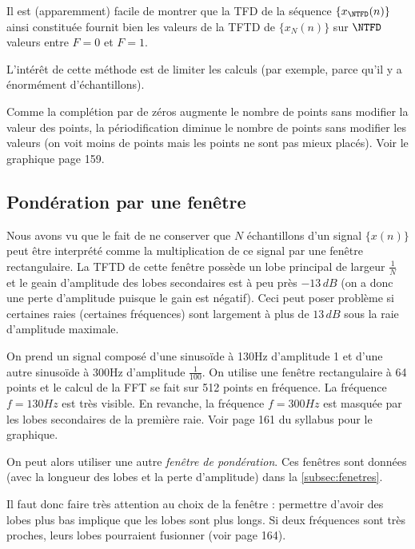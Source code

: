                 Il est (apparemment) facile de montrer que la TFD de la séquence $\{x_{\NTFD}(n)\}$ ainsi constituée fournit bien les valeurs de la TFTD de $\{x_N(n)\}$ sur $\NTFD$ valeurs entre $F=0$ et $F=1$.

                L'intérêt de cette méthode est de limiter les calculs (par exemple, parce qu'il y a énormément d'échantillons).

                Comme la complétion par de zéros augmente le nombre de points sans modifier la valeur des points, la périodification diminue le nombre de points sans modifier les valeurs (on voit moins de points mais les points ne sont pas mieux placés). Voir le graphique page 159.
        
        \subsection{Pondération par une fenêtre}
            Nous avons vu que le fait de ne conserver que $N$ échantillons d'un signal $\{x(n)\}$ peut être interprété comme la multiplication de ce signal par une fenêtre rectangulaire. La TFTD de cette fenêtre possède un lobe principal de largeur $\frac{1}{N}$ et le geain d'amplitude des lobes secondaires est à peu près $-13\,dB$ (on a donc une perte d'amplitude puisque le gain est négatif). Ceci peut poser problème si certaines raies (certaines fréquences) sont largement à plus de $13\,dB$ sous la raie d'amplitude maximale.

            \begin{exemple}
                On prend un signal composé d'une sinusoïde à 130Hz d'amplitude 1 et d'une autre sinusoïde à 300Hz d'amplitude $\frac{1}{100}$. On utilise une fenêtre rectangulaire à 64 points et le calcul de la FFT se fait sur 512 points en fréquence. La fréquence $f=130Hz$ est très visible. En revanche, la fréquence $f=300Hz$ est masquée par les lobes secondaires de la première raie. Voir page 161 du syllabus pour le graphique.
            \end{exemple}

            On peut alors utiliser une autre \textit{fenêtre de pondération}. Ces fenêtres sont données (avec la longueur des lobes et la perte d'amplitude) dans la \autoref{subsec:fenetres}.

            Il faut donc faire très attention au choix de la fenêtre : permettre d'avoir des lobes plus bas implique que les lobes sont plus longs. Si deux fréquences sont très proches, leurs lobes pourraient fusionner (voir page 164).

